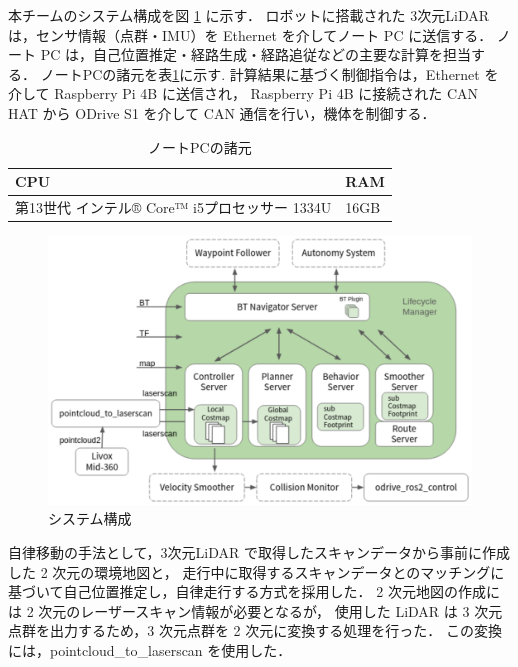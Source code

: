 \documentclass[twocolumn,9pt]{jsproceedings}
\begin{document}
本チームのシステム構成を図 \ref{fig:shinsotu_system_diagram} に示す．
ロボットに搭載された 3次元LiDAR は，センサ情報（点群・IMU）を Ethernet を介してノート PC に送信する．
ノート PC は，自己位置推定・経路生成・経路追従などの主要な計算を担当する．
ノートPCの諸元を表\ref{table:laptop}に示す. 
計算結果に基づく制御指令は，Ethernet を介して Raspberry Pi 4B に送信され，
Raspberry Pi 4B に接続された CAN HAT から ODrive S1 を介して CAN 通信を行い，機体を制御する．

\begin{table}[H]
  \centering
  \caption{ノートPCの諸元}
  \label{table:laptop}
	  \begin{tabular}{|p{7.0cm}|l|}
    \hline
    CPU & RAM\\ 
    \hline
    第13世代 インテル® Core™ i5プロセッサー 1334U  & 16GB \\ 
    \hline
  \end{tabular}
\end{table}

\begin{figure}[h]
  \begin{center}
    \includegraphics[width=1.0\linewidth]{figs/shinsotu_system_diagram.pdf}
    \caption{システム構成 \cite{nav2_docs}}
    \label{fig:shinsotu_system_diagram}
  \end{center}
\end{figure}

自律移動の手法として，3次元LiDAR で取得したスキャンデータから事前に作成した 2 次元の環境地図と，
走行中に取得するスキャンデータとのマッチングに基づいて自己位置推定し，自律走行する方式を採用した．
2 次元地図の作成には 2 次元のレーザースキャン情報が必要となるが，
使用した LiDAR は 3 次元点群を出力するため，3 次元点群を 2 次元に変換する処理を行った．
この変換には，pointcloud\_to\_laserscan \cite{pcl_lsc} を使用した．
\end{document}
